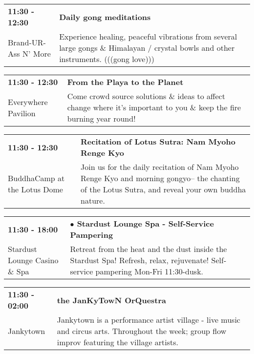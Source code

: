 \begin{tabular}{ p{1in} p{2.2in} }
    \textbf{11:30 - 12:30} & \textbf{Daily gong meditations} \\
    Brand-UR-Ass N' More \newline  & Experience healing, peaceful vibrations from several large gongs \& Himalayan / crystal bowls and other instruments. (((gong love))) \\
    \hline 
\end{tabular}
    
\begin{tabular}{ p{1in} p{2.2in} }
    \textbf{11:30 - 12:30} & \textbf{From the Playa to the Planet} \\
    Everywhere Pavilion \newline  & Come crowd source solutions \& ideas to affect change where it's important to you \& keep the fire burning year round! \\
    \hline 
\end{tabular}
    
\begin{tabular}{ p{1in} p{2.2in} }
    \textbf{11:30 - 12:30} & \textbf{Recitation of Lotus Sutra: Nam Myoho Renge Kyo} \\
    BuddhaCamp at the Lotus Dome \newline  & Join us for the daily recitation of Nam Myoho Renge Kyo and morning gongyo-- the chanting of the Lotus Sutra, and reveal your own buddha nature. \\
    \hline 
\end{tabular}
    
\begin{tabular}{ p{1in} p{2.2in} }
    \textbf{11:30 - 18:00} & \textbf{$\bullet$	Stardust Lounge Spa - Self-Service Pampering} \\
    Stardust Lounge Casino \& Spa \newline  & Retreat from the heat and the dust inside the Stardust Spa! Refresh, relax, rejuvenate! Self-service pampering Mon-Fri 11:30-dusk. \\
    \hline 
\end{tabular}
    
\begin{tabular}{ p{1in} p{2.2in} }
    \textbf{11:30 - 02:00} & \textbf{the JanKyTowN OrQuestra} \\
    Jankytown \newline  & Jankytown is a performance artist village - live music and circus arts.  Throughout the week; group flow improv featuring the village artists. \\
    \hline 
\end{tabular}
    
